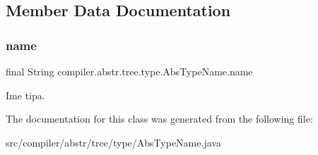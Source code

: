 \subsection{Member Data Documentation}
\mbox{\label{classcompiler_1_1abstr_1_1tree_1_1type_1_1_abs_type_name_a41a111c2c38fc5178c2160497a7bb017}} 
\subsubsection{\texorpdfstring{name}{name}}
{\footnotesize\ttfamily final String compiler.\+abstr.\+tree.\+type.\+Abs\+Type\+Name.\+name}

Ime tipa. 

The documentation for this class was generated from the following file\+:\begin{DoxyCompactItemize}
\item 
src/compiler/abstr/tree/type/Abs\+Type\+Name.\+java\end{DoxyCompactItemize}
